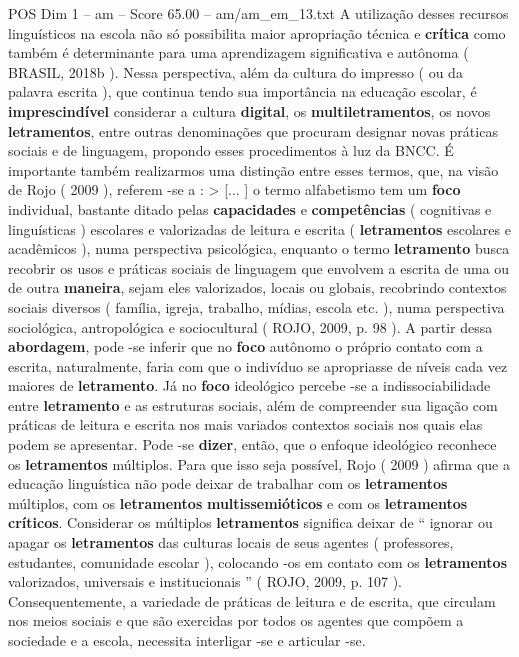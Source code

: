 \begin{textsample}{POS Dim 1 – am – Score 65.00 – am/am\_em\_13.txt}
A utilização desses recursos linguísticos na escola não só possibilita maior apropriação técnica e \textbf{crítica} como também é determinante para uma aprendizagem significativa e autônoma ( BRASIL, 2018b ).
Nessa perspectiva, além da cultura do impresso ( ou da palavra escrita ), que continua tendo sua importância na educação escolar, é \textbf{imprescindível} considerar a cultura \textbf{digital}, os \textbf{multiletramentos}, os novos \textbf{letramentos}, entre outras denominações que procuram designar novas práticas sociais e de linguagem, propondo esses procedimentos à luz da BNCC.
É importante também realizarmos uma distinção entre esses termos, que, na visão de Rojo ( 2009 ), referem -se a : > [... ] o termo alfabetismo tem um \textbf{foco} individual, bastante ditado pelas \textbf{capacidades} e \textbf{competências} ( cognitivas e linguísticas ) escolares e valorizadas de leitura e escrita ( \textbf{letramentos} escolares e acadêmicos ), numa perspectiva psicológica, enquanto o termo \textbf{letramento} busca recobrir os usos e práticas sociais de linguagem que envolvem a escrita de uma ou de outra \textbf{maneira}, sejam eles valorizados, locais ou globais, recobrindo contextos sociais diversos ( família, igreja, trabalho, mídias, escola etc. ), numa perspectiva sociológica, antropológica e sociocultural ( ROJO, 2009, p. 98 ).
A partir dessa \textbf{abordagem}, pode -se inferir que no \textbf{foco} autônomo o próprio contato com a escrita, naturalmente, faria com que o indivíduo se apropriasse de níveis cada vez maiores de \textbf{letramento}.
Já no \textbf{foco} ideológico percebe -se a indissociabilidade entre \textbf{letramento} e as estruturas sociais, além de compreender sua ligação com práticas de leitura e escrita nos mais variados contextos sociais nos quais elas podem se apresentar.
Pode -se \textbf{dizer}, então, que o enfoque ideológico reconhece os \textbf{letramentos} múltiplos.
Para que isso seja possível, Rojo ( 2009 ) afirma que a educação linguística não pode deixar de trabalhar com os \textbf{letramentos} múltiplos, com os \textbf{letramentos} \textbf{multissemióticos} e com os \textbf{letramentos} \textbf{críticos}.
Considerar os múltiplos \textbf{letramentos} significa deixar de “ ignorar ou apagar os \textbf{letramentos} das culturas locais de seus agentes ( professores, estudantes, comunidade escolar ), colocando -os em contato com os \textbf{letramentos} valorizados, universais e institucionais ” ( ROJO, 2009, p. 107 ).
Consequentemente, a variedade de práticas de leitura e de escrita, que circulam nos meios sociais e que são exercidas por todos os agentes que compõem a sociedade e a escola, necessita interligar -se e articular -se.

\end{textsample}
